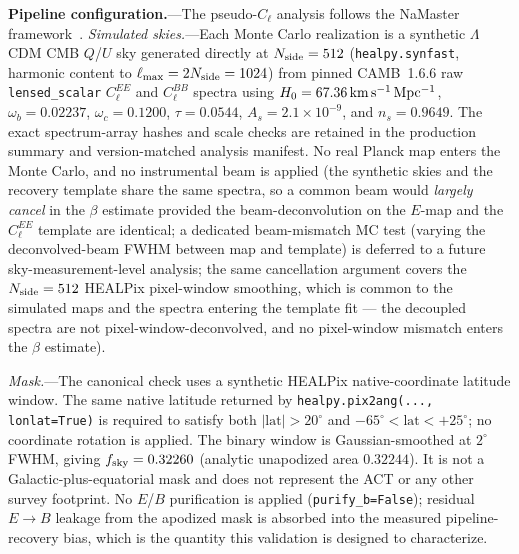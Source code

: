 \documentclass[aps,prd,twocolumn,superscriptaddress,showpacs,preprintnumbers,nofootinbib,longbibliography,floatfix]{revtex4-2}
\begin{document}
\noindent\textbf{Pipeline configuration.}---The pseudo-$C_\ell$ analysis follows the NaMaster framework~\cite{Alonso2019}.
\emph{Simulated skies.}---Each Monte Carlo realization is a synthetic
$\Lambda$CDM CMB $Q$/$U$ sky generated directly at $N_{\rm side}=512$
(\texttt{healpy.synfast}, harmonic content to
$\ell_{\rm max}=2N_{\rm side}=1024$) from pinned CAMB~1.6.6 raw
\texttt{lensed\_scalar} $C_\ell^{EE}$ and $C_\ell^{BB}$ spectra using
$H_0=67.36\,{\rm km\,s^{-1}\,Mpc^{-1}}$, $\omega_b=0.02237$,
$\omega_c=0.1200$, $\tau=0.0544$, $A_s=2.1\times10^{-9}$, and
$n_s=0.9649$. The exact spectrum-array hashes and scale checks are retained
in the production summary and version-matched analysis manifest. No real Planck map enters the
Monte Carlo, and no instrumental beam is applied (the synthetic skies and
the recovery template share the same spectra, so a common beam would
\emph{largely cancel} in the $\beta$ estimate provided the beam-deconvolution
on the $E$-map and the $C_\ell^{EE}$ template are identical; a dedicated
beam-mismatch MC test (varying the deconvolved-beam FWHM between map and
template) is deferred to a future sky-measurement-level analysis;
the same cancellation argument covers the
$N_{\rm side}=512$ HEALPix pixel-window smoothing, which is common to the
simulated maps and the spectra entering the template fit --- the decoupled
spectra are not pixel-window-deconvolved, and no pixel-window mismatch
enters the $\beta$ estimate).

\emph{Mask.}---The canonical check uses a synthetic HEALPix
native-coordinate latitude window. The same native latitude returned by
\texttt{healpy.pix2ang(..., lonlat=True)} is required to satisfy both
$|\mathrm{lat}|>20^\circ$ and
$-65^\circ<\mathrm{lat}<+25^\circ$; no coordinate rotation is applied.
The binary window is Gaussian-smoothed at $2^\circ$ FWHM, giving
$f_{\rm sky}=0.32260$ (analytic unapodized area $0.32244$). It is not a
Galactic-plus-equatorial mask and does not represent the ACT or any other
survey footprint. No $E$/$B$ purification is applied
(\texttt{purify\_b=False}); residual $E\!\to\!B$ leakage from the apodized
mask is absorbed into the measured pipeline-recovery bias, which is the
quantity this validation is designed to characterize.
\end{document}
